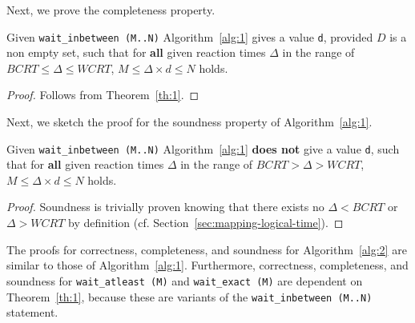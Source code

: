 Next, we prove the completeness property.
\begin{theorem}
  Given \texttt{wait\_inbetween (M..N)} Algorithm~\ref{alg:1} gives a
  value \texttt{d}, provided $D$ is a non empty set, such that for
  \textbf{all} given reaction times $\Delta$ in the range of $BCRT \leq
  \Delta \leq WCRT$, $M \leq \Delta \times d \leq N$ holds.
\end{theorem}
\begin{proof}
  Follows from Theorem~\ref{th:1}.
\end{proof}

Next, we sketch the proof for the soundness property of
Algorithm~\ref{alg:1}.

\begin{theorem}
  Given \texttt{wait\_inbetween (M..N)} Algorithm~\ref{alg:1}
  \textbf{does not} give a value \texttt{d}, such that for \textbf{all}
  given reaction times $\Delta$ in the range of $BCRT > \Delta > WCRT$,
  $M \leq \Delta \times d \leq N$ holds.
\end{theorem}

\begin{proof}
  Soundness is trivially proven knowing that there exists no $\Delta <
  BCRT$ or $\Delta > WCRT$ by definition
  (cf. Section~\ref{sec:mapping-logical-time}).
\end{proof}

The proofs for correctness, completeness, and soundness for
Algorithm~\ref{alg:2} are similar to those of
Algorithm~\ref{alg:1}. Furthermore, correctness, completeness, and
soundness for \texttt{wait\_atleast (M)} and \texttt{wait\_exact (M)}
are dependent on Theorem~\ref{th:1}, because these are variants of the
\texttt{wait\_inbetween (M..N)} statement.

